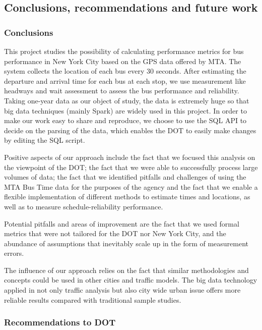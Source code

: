 \documentclass[12pt]{report}
\begin{document}
\subsection{Conclusions, recommendations and future work}

\subsubsection*{Conclusions}


This project studies the possibility of calculating performance metrics for bus performance in New York City based on the GPS data offered by MTA. The system collects the location of each bus every 30 seconds. After estimating the departure and arrival time for each bus at each stop, we use measurement like headways and wait assessment to assess the bus performance and reliability. Taking one-year data as our object of study, the data is extremely huge so that big data techniques (mainly Spark) are widely used in this project. In order to make our work easy to share and reproduce, we choose to use the SQL API to decide on the parsing of the data, which enables the DOT to easily make changes by editing the SQL script. 


Positive aspects of our approach include the fact that we focused this analysis on the viewpoint of the DOT; the fact that we were able to successfully process large volumes of data; the fact that we identified pitfalls and challenges of using the MTA Bus Time data for the purposes of the agency and the fact that we enable a flexible implementation of different methods to estimate times and locations, as well as to measure schedule-reliability performance.


Potential pitfalls and areas of improvement are the fact that we used formal metrics that were not tailored for the DOT nor New York City, and the abundance of assumptions that inevitably scale up in the form of measurement errors.


The influence of our approach relies on the fact that similar methodologies and concepts could be used in other cities and traffic models. The big data technology applied in not only traffic analysis but also city wide urban issue offers more reliable results compared with traditional sample studies.  

\subsubsection*{Recommendations to DOT}
\end{document}

